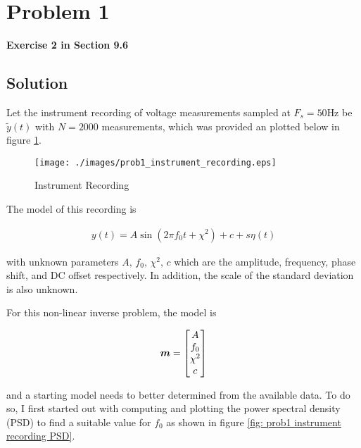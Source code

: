 
\begingroup
\allowdisplaybreaks

\newpage
\section{Problem 1}

\textbf{Exercise 2 in Section 9.6}

\subsection{Solution}

Let the instrument recording of voltage measurements sampled at $F_s = 50 \unit{\hertz}$ be $\tilde{y}\left(t\right)$ with $N = 2000$ measurements, which was provided an plotted below in figure \ref{fig: prob1 instrument recording}.

\begin{figure}[h] 
	\centering
	\texttt{[image: ./images/prob1\_instrument\_recording.eps]}
	\caption{Instrument Recording}
	\label{fig: prob1 instrument recording}
\end{figure}
\FloatBarrier

The model of this recording is

\begin{align*}
	y(t) = A \sin\left( 2 \pi f_0 t + \chi^2 \right) + c + s\eta\left( t \right)
\end{align*}

with unknown parameters $A,\,f_0,\,\chi^2,\,c$ which are the amplitude, frequency, phase shift, and DC offset respectively. In addition, the scale of the standard deviation is also unknown. 

For this non-linear inverse problem, the model is 

\begin{align*}
	\boldsymbol{m} = \begin{bmatrix} A \\ f_0 \\ \chi^2 \\ c \end{bmatrix}
\end{align*}

and a starting model needs to better determined from the available data. To do so, I first started out with computing and plotting the power spectral density (PSD) to find a suitable value for $f_0$ as shown in figure \ref{fig: prob1 instrument recording PSD}. 

